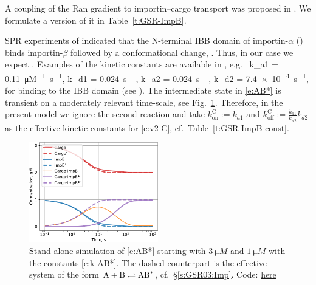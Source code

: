 \documentclass[12pt,notitlepage]{article}
\def\[#1\]{\begin{align}#1\end{align}}
\begin{document}
A coupling of the Ran gradient
to 
importin--cargo transport
was proposed in 
\cite[Fig.~6A]{GoerlichSeewaldRibbeck2003}.
%
We formulate a version of it in 
Table~\ref{t:GSR-ImpB}.

%

SPR experiments of \cite{Catimel2001}
indicated that
the N-terminal IBB domain of importin-$\alpha$ 
()
binds importin-$\beta$
followed by a conformational change,
.
%
%
Thus, in our case we expect
\[
	\label{e:AB*}
	.
\]
%
%
Examples of the kinetic constants
are available in \cite[Table~I]{Catimel2001},
e.g.~%
\[
	\label{e:k-AB*}
	k_{a1} = \SI{0.11}{\micro M^{-1} . s^{-1}},
	\quad
	k_{d1} = \SI{0.024}{s^{-1}},
	\qquad
	k_{a2} = \SI{0.024}{s^{-1}},
	\quad
	k_{d2} = \SI{7.4e-4}{s^{-1}},
\]
for  binding to the IBB domain (see \cite{Catimel2001}).
%
%
The intermediate state in \eqref{e:AB*} is transient
on a moderately relevant time-scale,
see Fig.~\ref{f:AB*}.
%
Therefore,
in the present model
we ignore the second reaction
and take
$k_\text{on}^\text{C} := k_{a1}$ and 
$k_\text{off}^\text{C} := \frac{k_{d1}}{k_{a2}} k_{d2}$
as the effective kinetic constants 
for \eqref{e:v2-C}, cf.~Table~\ref{t:GSR-ImpB-const}.
%

\begin{figure}
\centering
\includegraphics[width=0.5\textwidth]{20210407-Rearrangement/python/timecourse}
\caption{%
	Stand-alone
	simulation of
	\eqref{e:AB*}
	starting with $\SI{3}{\micro M}$ 
	and $\SI{1}{\micro M}$ 
	with
	the constants \eqref{e:k-AB*}.
	The dashed counterpart
	is the effective system 
	of the form
	$\ce{A} + \ce{B} \rightleftharpoons \ce{AB^*}$,
	cf.~\S\ref{s:GSR03:Imp}.
	Code: \href{https://github.com/numpde/nct1/tree/main/code/20210407-Rearrangement}{here}
}
\label{f:AB*}
\end{figure}
\end{document}
